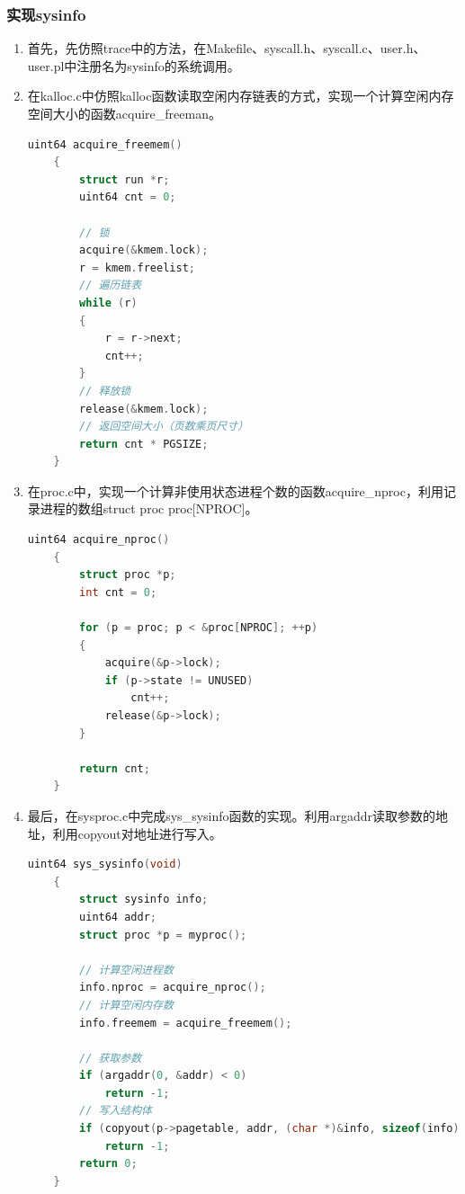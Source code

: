 \subsubsection{实现sysinfo}
\begin{enumerate}
    \item 首先，先仿照trace中的方法，在Makefile、syscall.h、syscall.c、user.h、user.pl中注册名为sysinfo的系统调用。
    \item 在kalloc.c中仿照kalloc函数读取空闲内存链表的方式，实现一个计算空闲内存空间大小的函数acquire\_freeman。
          \begin{lstlisting}[language=c, title=acquire\_freemem的实现]
    uint64 acquire_freemem()
    {
        struct run *r;
        uint64 cnt = 0;

        // 锁
        acquire(&kmem.lock);
        r = kmem.freelist;
        // 遍历链表
        while (r)
        {
            r = r->next;
            cnt++;
        }
        // 释放锁
        release(&kmem.lock);
        // 返回空间大小（页数乘页尺寸）
        return cnt * PGSIZE;
    }
    \end{lstlisting}
    \item 在proc.c中，实现一个计算非使用状态进程个数的函数acquire\_nproc，利用记录进程的数组struct proc proc[NPROC]。
          \begin{lstlisting}[language=c, title=acquire\_nproc的实现]
    uint64 acquire_nproc()
    {
        struct proc *p;
        int cnt = 0;
    
        for (p = proc; p < &proc[NPROC]; ++p)
        {
            acquire(&p->lock);
            if (p->state != UNUSED)
                cnt++;
            release(&p->lock);
        }
    
        return cnt;
    }    
    \end{lstlisting}
    \item 最后，在sysproc.c中完成sys\_sysinfo函数的实现。利用argaddr读取参数的地址，利用copyout对地址进行写入。
          \begin{lstlisting}[language=c, title=sys\_sysinfo的实现]
    uint64 sys_sysinfo(void)
    {
        struct sysinfo info;
        uint64 addr;
        struct proc *p = myproc();

        // 计算空闲进程数
        info.nproc = acquire_nproc();
        // 计算空闲内存数
        info.freemem = acquire_freemem();

        // 获取参数
        if (argaddr(0, &addr) < 0)
            return -1;
        // 写入结构体
        if (copyout(p->pagetable, addr, (char *)&info, sizeof(info)) < 0)
            return -1;
        return 0;
    }
    \end{lstlisting}
\end{enumerate}

